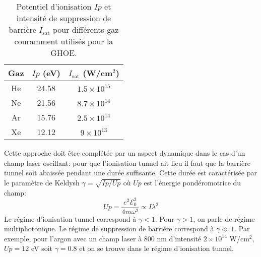\begin{table}
\begin{center}
\begin{tabular}{|c|c|c|}
\hline
Gaz & $Ip$ (eV) & $I_\text{sat}$ (W/cm$^2$) \\
\hline
He & 24.58 & $1.5 \times 10^{15}$ \\
\hline
Ne & 21.56 & $8.7 \times 10^{14}$ \\
\hline
Ar & 15.76 & $2.5 \times 10^{14}$ \\
\hline
Xe & 12.12 & $9 \times 10^{13}$ \\
\hline
\end{tabular}
\end{center}
\caption{Potentiel d'ionisation $Ip$ et intensité de suppression de barrière $I_\text{sat}$ pour différents gaz couramment utilisés pour la GHOE.}
\label{tab:Isat}
\end{table}

Cette approche doit être complétée par un aspect dynamique dans le cas d'un champ laser oscillant: pour que l'ionisation tunnel ait lieu il faut que la barrière tunnel soit abaissée pendant une durée suffisante. Cette durée est caractérisée par le paramètre de Keldysh  $\gamma = \sqrt{Ip/Up}$ où $Up$ est l'énergie pondéromotrice du champ:
\begin{equation}
Up = \frac{e^2 \mathcal{E}_0^2}{4 m \omega^2} \propto I \lambda^2
\label{eq:Up}
\end{equation}
Le régime d'ionisation tunnel correspond à $\gamma < 1$. Pour $\gamma > 1$, on parle de régime multiphotonique. Le régime de suppression de barrière correspond à $\gamma \ll 1$. Par exemple, pour l'argon avec un champ laser à 800 nm d'intensité $2 \times 10^{14}$ W/cm$^2$, $Up = 12$ eV soit $\gamma = 0.8$ et on se trouve dans le régime d'ionisation tunnel.

